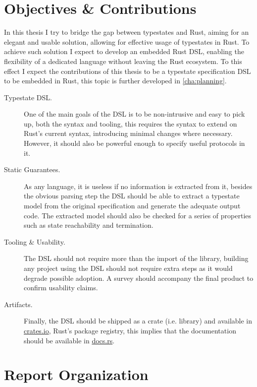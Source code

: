 \section{Objectives \& Contributions}\label{sec:objectives}

In this thesis I try to bridge the gap between typestates and Rust,
aiming for an elegant and usable solution, allowing for effective usage of typestates in Rust.
To achieve such solution I expect to develop an embedded Rust DSL,
enabling the flexibility of a dedicated language without leaving the Rust ecosystem.
To this effect I expect the contributions of this thesis to be a typestate specification DSL to be embedded in Rust,
this topic is further developed in \autoref{cha:planning}.

\begin{description}
    \item[Typestate DSL.] One of the main goals of the DSL is to be non-intrusive and easy to pick up, both the syntax and tooling,
          this requires the syntax to extend on Rust's current syntax, introducing minimal changes where necessary.
          However, it should also be powerful enough to specify useful protocols in it.
    \item[Static Guarantees.] As any language, it is useless if no information is extracted from it,
          besides the obvious parsing step the DSL should be able to extract a typestate model from the original specification
          and generate the adequate output code.
          The extracted model should also be checked for a series of properties such as state reachability and termination.
    \item[Tooling \& Usability.] The DSL should not require more than the import of the library,
          building any project using the DSL should not require extra steps as it would degrade possible adoption.
          A survey should accompany the final product to confirm usability claims.
    \item[Artifacts.] Finally, the DSL should be shipped as a crate (i.e. library) and available in \url{crates.io}, Rust's package registry,
          this implies that the documentation should be available in \url{docs.rs}.
\end{description}

\section{Report Organization}\label{sec:organization}


